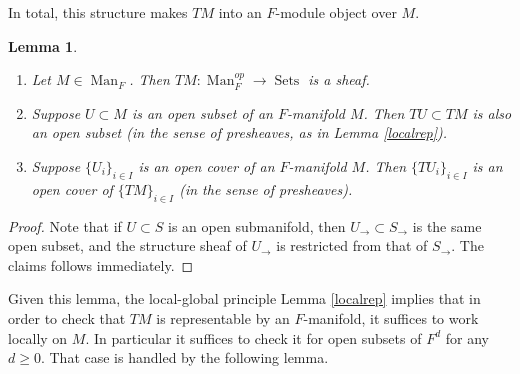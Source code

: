 \documentclass[12pt]{article}
\newtheorem{lemma}[theorem]{Lemma}
\begin{document}
In total, this structure makes $TM$ into an $F$-module object over $M$.

\begin{lemma}
\begin{enumerate}
\item Let $M\in\operatorname{Man}_F$.  Then $TM:\operatorname{Man}_F^{op}\rightarrow\operatorname{Sets}$ is a sheaf.
\item Suppose $U\subset M$ is an open subset of an $F$-manifold $M$.  Then $TU\subset TM$ is also an open subset (in the sense of presheaves, as in Lemma \ref{localrep}).
\item  Suppose $\{U_i\}_{i\in I}$ is an open cover of an $F$-manifold $M$.  Then $\{TU_i\}_{i\in I}$ is an open cover of $\{TM\}_{i\in I}$ (in the sense of presheaves).
\end{enumerate}
\end{lemma}
\begin{proof}
Note that if $U\subset S$ is an open submanifold, then $U_{\rightarrow} \subset S_{\rightarrow}$ is the same open subset, and the structure sheaf of $U_{\rightarrow}$ is restricted from that of $S_{\rightarrow}$.  The claims follows immediately.
\end{proof}

Given this lemma, the local-global principle Lemma \ref{localrep} implies that in order to check that $TM$ is representable by an $F$-manifold, it suffices to work locally on $M$.  In particular it suffices to check it for open subsets of $F^d$ for any $d\geq 0$.  That case is handled by the following lemma.
\end{document}
